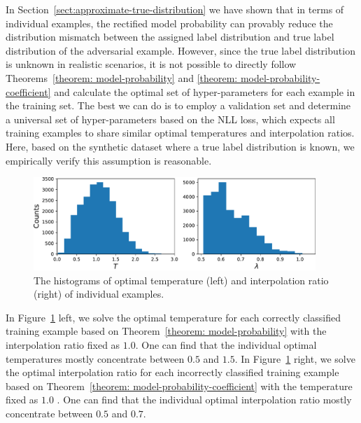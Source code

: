 
\label{sect:optimal-temperature-mixup}
In Section~\ref{sect:approximate-true-distribution} we have shown that in terms of individual examples, the rectified model probability can provably reduce the distribution mismatch between the assigned label distribution and true label distribution of the adversarial example. %
However, since the true label distribution is unknown in realistic scenarios, it is not possible to directly follow Theorems~\ref{theorem: model-probability} and \ref{theorem: model-probability-coefficient} and calculate the optimal set of hyper-parameters for each example in the training set. The best we can do is to employ a validation set and determine a universal set of hyper-parameters based on the NLL loss, which expects all training examples to share similar optimal temperatures and interpolation ratios. 
Here, based on the synthetic dataset where a true label distribution is known, we empirically verify this assumption is reasonable.

\begin{figure}[!ht]
  \centering
  \includegraphics[width=0.95\textwidth]{figures/method-augment-optimal.pdf}
  \caption{The histograms of optimal temperature (left) and interpolation ratio (right) of individual examples.
  }
\label{fig:method-augment-optimal}
\end{figure}


In Figure~\ref{fig:method-augment-optimal} left, we solve the optimal temperature for each correctly classified training example based on Theorem~\ref{theorem: model-probability} with the interpolation ratio fixed as $1.0$. One can find that the individual optimal temperatures mostly concentrate between $0.5$ and $1.5$. In Figure~\ref{fig:method-augment-optimal} right, we solve the optimal interpolation ratio for each incorrectly classified training example based on Theorem~\ref{theorem: model-probability-coefficient} with the temperature fixed as $1.0$ . One can find that the individual optimal interpolation ratio mostly concentrate between $0.5$ and $0.7$.



